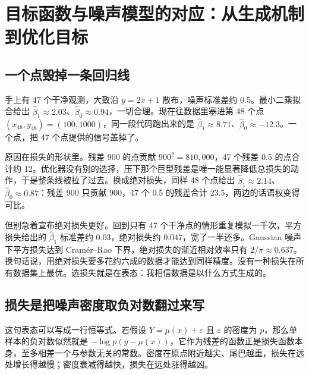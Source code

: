 \section{目标函数与噪声模型的对应：从生成机制到优化目标}
\label{sec:13-Machine-Learning/01-Learning-Problems-and-Evaluation/03}

\subsection{一个点毁掉一条回归线}

手上有 47 个干净观测，大致沿 \(y=2x+1\) 散布，噪声标准差约 0.5。最小二乘拟合给出 \(\widehat\beta_1\approx 2.03\)、\(\widehat\beta_0\approx 0.94\)，一切合理。现在往数据里塞进第 48 个点 \((x_{48},y_{48})=(100,1000)\)，同一段代码跑出来的是 \(\widehat\beta_1\approx 8.71\)、\(\widehat\beta_0\approx -12.3\)。一个点，把 47 个点提供的信号盖掉了。

原因在损失的形状里。残差 900 的点贡献 \(900^2=810{,}000\)，47 个残差 0.5 的点合计约 12。优化器没有别的选择，压下那个巨型残差是唯一能显著降低总损失的动作，于是整条线被拉了过去。换成绝对损失，同样 48 个点给出 \(\widehat\beta_1\approx 2.14\)、\(\widehat\beta_0\approx 0.87\)：残差 900 只贡献 900，47 个 0.5 的残差合计 23.5，两边的话语权变得可比。

但别急着宣布绝对损失更好。回到只有 47 个干净点的情形重复模拟一千次，平方损失给出的 \(\widehat\beta_1\) 标准差约 0.03，绝对损失约 0.047，宽了一半还多。Gaussian 噪声下平方损失达到 Cram\'er--Rao 下界，绝对损失的渐近相对效率只有 \(2/\pi\approx 0.637\)。换句话说，用绝对损失要多花约六成的数据才能达到同样精度。没有一种损失在所有数据集上最优。选损失就是在表态：我相信数据是以什么方式生成的。

\subsection{损失是把噪声密度取负对数翻过来写}

这句表态可以写成一行恒等式。若假设 \(Y=\mu(x)+\varepsilon\) 且 \(\varepsilon\) 的密度为 \(p\)，那么单样本的负对数似然就是 \(-\log p(y-\mu(x))\)，它作为残差的函数正是损失函数本身，至多相差一个与参数无关的常数。密度在原点附近越尖、尾巴越重，损失在远处增长得越慢；密度衰减得越快，损失在远处涨得越凶。

